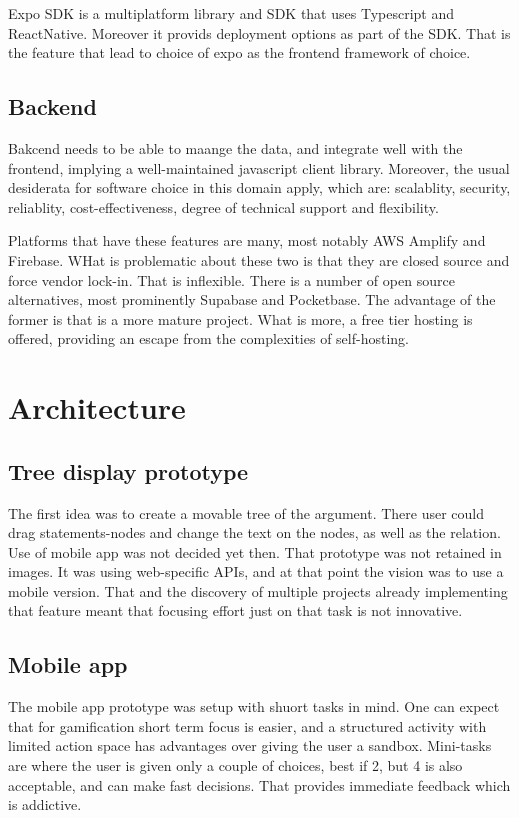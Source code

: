 \documentclass{report}
\begin{document}
{Expo SDK is a multiplatform library and SDK that uses Typescript and ReactNative.
Moreover it provids deployment options as part of the SDK. That is the feature that lead to choice of expo as the frontend framework of choice. 

\subsection{Backend}

Bakcend needs to be able to maange the data, and integrate well with the frontend, implying a well-maintained javascript client library.
Moreover, the usual desiderata for software choice in this domain apply, which are: scalablity, security, reliablity, cost-effectiveness, degree of technical support and flexibility. 

Platforms that have these features are many, most notably AWS Amplify and Firebase. WHat is problematic about these two is that they are closed source and force vendor lock-in. 
\cite{noauthor_firebase_2023}
\cite{noauthor_aws-amplifyamplify-js_2023}
That is inflexible. There is a number of open source alternatives, most prominently Supabase and Pocketbase. 
\cite{noauthor_supabase-js_2023} \cite{noauthor_pocketbase_2023}
The advantage of the former is that is a more mature project. What is more, a free tier hosting is offered, providing an escape from the complexities of self-hosting. 
\cite{noauthor_pocketbase_nodate}

\section{Architecture}
\subsection{Tree display prototype}
The first idea was to create a movable tree of the argument. There user could drag statements-nodes and change the text on the nodes, as well as the relation.
Use of mobile app was not decided yet then. That prototype was not retained in images. It was using web-specific APIs, and at that point the vision was to use a mobile version. That and the discovery of multiple projects already implementing that feature meant that focusing effort just on that task is not innovative. 

\subsection{Mobile app}
The mobile app prototype was setup with shuort tasks in mind. One can expect that for gamification short term focus is easier, and a structured activity with limited action space has advantages over giving the user a sandbox. Mini-tasks are where the user is given only a couple of choices, best if 2, but 4 is also acceptable, and can make fast decisions. That provides immediate feedback which is addictive. 

}
\end{document}
